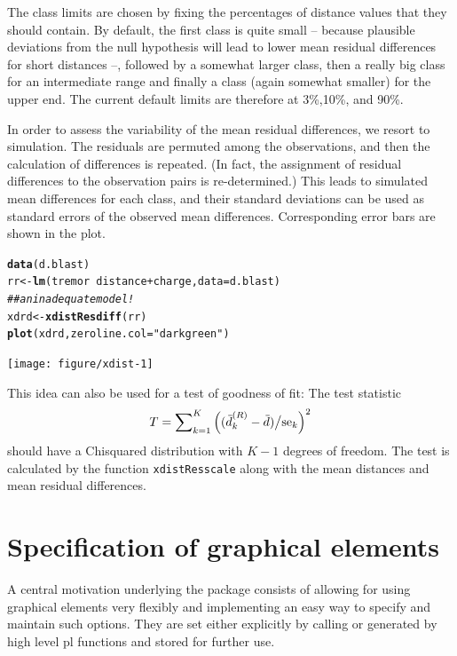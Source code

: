\documentclass[11pt]{article}\usepackage[]{graphicx}\usepackage[]{color}
\makeatletter
\newcommand{\hlstr}[1]{\textcolor[rgb]{0.192,0.494,0.8}{#1}}%
\newcommand{\hlcom}[1]{\textcolor[rgb]{0.678,0.584,0.686}{\textit{#1}}}%
\newcommand{\hlopt}[1]{\textcolor[rgb]{0,0,0}{#1}}%
\newcommand{\hlstd}[1]{\textcolor[rgb]{0.345,0.345,0.345}{#1}}%
\newcommand{\hlkwb}[1]{\textcolor[rgb]{0.69,0.353,0.396}{#1}}%
\newcommand{\hlkwc}[1]{\textcolor[rgb]{0.333,0.667,0.333}{#1}}%
\newcommand{\hlkwd}[1]{\textcolor[rgb]{0.737,0.353,0.396}{\textbf{#1}}}%
\newenvironment{kframe}{%
 \def\at@end@of@kframe{}%
 \ifinner\ifhmode%
  \def\at@end@of@kframe{\end{minipage}}%
  \begin{minipage}{\columnwidth}%
 \fi\fi%
 \def\FrameCommand##1{\hskip\@totalleftmargin \hskip-\fboxsep
 \colorbox{shadecolor}{##1}\hskip-\fboxsep
     \hskip-\linewidth \hskip-\@totalleftmargin \hskip\columnwidth}%
 \MakeFramed {\advance\hsize-\width
   \@totalleftmargin\z@ \linewidth\hsize
   \@setminipage}}%
 {\par\unskip\endMakeFramed%
 \at@end@of@kframe}
\newenvironment{knitrout}{}{} %
\makeatother
\begin{document}
The class limits are chosen by fixing the percentages of distance values
that they should contain. By default, the first class is quite small -- 
because plausible deviations from the null hypothesis will lead to lower
mean residual differences for short distances --, followed by a somewhat
larger class, then a really big class for an intermediate range and finally
a class (again somewhat smaller) for the upper end. 
The current default limits are therefore at 3\%,10\%, and 90\%. 

In order to assess the variability of the mean residual differences,
we resort to simulation. The residuals are permuted among the observations,
and then the calculation of differences is repeated.
(In fact, the assignment of residual differences to the observation pairs 
is re-determined.) This leads to simulated mean differences for each class,
and their standard deviations can be used as standard errors of the 
observed mean differences. Corresponding error bars are shown in the
plot. 

\begin{knitrout}
\color{fgcolor}\begin{kframe}
\begin{alltt}
\hlkwd{data}\hlstd{(d.blast)}
\hlstd{rr} \hlkwb{<-} \hlkwd{lm}\hlstd{(tremor}\hlopt{~}\hlstd{distance}\hlopt{+}\hlstd{charge,} \hlkwc{data}\hlstd{=d.blast)}
\hlcom{## an inadequate model!}
\hlstd{xdrd} \hlkwb{<-} \hlkwd{xdistResdiff}\hlstd{(rr)}
\hlkwd{plot}\hlstd{(xdrd,} \hlkwc{zeroline.col}\hlstd{=}\hlstr{"darkgreen"}\hlstd{)}
\end{alltt}
\end{kframe}
\texttt{[image: figure/xdist-1]} 

\end{knitrout}

This idea can also be used for a test of goodness of fit: The test
statistic 
$$
  T = \sum\nolimits_{k=1}^K \left((\wb d\sups R_k-\wb d)\big/\mbox{se}_k\right)^2
$$
should have a Chisquared distribution with $K-1$ degrees of freedom.
The test is calculated by the function \texttt{xdistResscale} along with
the mean distances and mean residual differences.

\section{Specification of graphical elements}
A central motivation underlying the  package consists of
allowing for using graphical elements very flexibly and implementing an
easy way to specify and maintain such options.
They are set either explicitly by calling  or generated
by high level pl functions and stored for further use.
\end{document}
